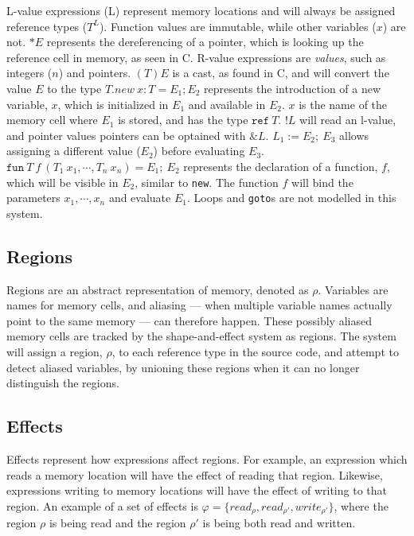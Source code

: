 \newpar L-value expressions (L) represent memory locations and will always be assigned reference types ($T^L$). Function values are immutable, while other variables ($x$) are not. $*E$ represents the dereferencing of a pointer, which is looking up the reference cell in memory, as seen in C. R-value expressions are \textit{values}, such as integers ($n$) and pointers. $(T)E$ is a cast, as found in C, and will convert the value $E$ to the type $T$.$new\: x : T = E_1; E_2$ represents the introduction of a new variable, $x$, which is initialized in $E_1$ and available in $E_2$. $x$ is the name of the memory cell where $E_1$ is stored, and has the type $\texttt{ref} \:T$. $!L$ will read an l-value, and pointer values pointers can be optained with $\&L$.
$L_1 := E_2 ;\: E_3$ allows assigning a different value ($E_2$) before evaluating $E_3$. $\texttt{fun} \:T\:f\:(T_1\:x_1, \cdots, T_n\:x_n) = E_1 ;\: E_2$ represents the declaration of a function, $f$, which will be visible in $E_2$, similar to \texttt{new}. The function $f$ will bind the parameters $x_1, \cdots, x_n$ and evaluate $E_1$. Loops and \texttt{goto}s are not modelled in this system. 

\subsection{Regions}
Regions are an abstract representation of memory, denoted as $\rho$. Variables are names for memory cells, and aliasing --- when multiple variable names actually point to the same memory --- can therefore happen. These possibly aliased memory cells are tracked by the shape-and-effect system as regions. The system will assign a region, $\rho$, to each reference type in the source code, and attempt to detect aliased variables, by unioning these regions when it can no longer distinguish the regions.

\subsection{Effects}
Effects represent how expressions affect regions. For example, an expression which reads a memory location will have the effect of reading that region. Likewise, expressions writing to memory locations will have the effect of writing to that region. An example of a set of effects is $\varphi = \{read_\rho , read_{\rho'} , write_{\rho'}\}$, where the region $\rho$ is being read and the region $\rho'$ is being both read and written.

